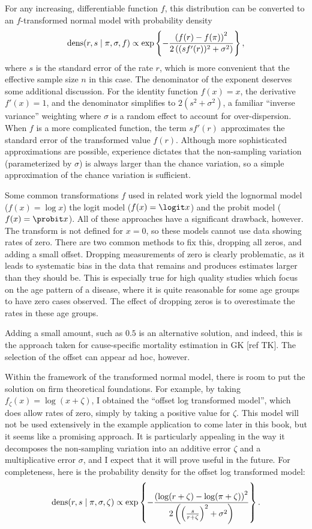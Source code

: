 For any increasing, differentiable function $f$, this distribution can be converted to
an $f$-transformed normal model with probability density
\[
\operatorname{dens}(r,s\;|\; \pi, \sigma, f) \propto \exp\left\{-\frac{\left(f(r)-f(\pi)\right)^2}{2\left((sf'(r))^2+\sigma^2\right)}\right\},
\]
where $s$ is the standard error of the rate $r$, which is more
convenient that the effective sample size $n$ in this case. The
denominator of the exponent deserves some additional discussion.  For
the identity function $f(x) = x$, the derivative $f'(x) = 1$, and the
denominator simplifies to $2(s^2 + \sigma^2)$, a familiar ``inverse
variance'' weighting where $\sigma$ is a random effect to account for
over-dispersion.  When $f$ is a more complicated function, the term
$sf'(r)$ approximates the standard error of the transformed value
$f(r)$.  Although more sophisticated approximations are possible,
experience dictates that the non-sampling variation (parameterized by
$\sigma$) is always larger than the chance variation, so a simple
approximation of the chance variation is sufficient.

Some common transformations $f$ used in related work yield the
lognormal model ($f(x) = \log x$) the logit model ($f(x) = \logit x$)
and the probit model ($f(x) = \probit x$).  All of these approaches
have a significant drawback, however.  The transform is not defined
for $x=0$, so these models cannot use data showing rates of zero.
There are two common methods to fix this, dropping all zeros, and
adding a small offset.  Dropping measurements of zero is clearly
problematic, as it leads to systematic bias in the data that remains
and produces estimates larger than they should be.  This is especially
true for high quality studies which focus on the age pattern of a
disease, where it is quite reasonable for some age groups to have zero
cases observed.  The effect of dropping zeros is to overestimate the
rates in these age groups.

Adding a small amount, such as $0.5$ is an alternative solution, and
indeed, this is the approach taken for cause-specific mortality estimation
in GK [ref TK].  The selection of the offset can appear ad hoc,
however.

Within the framework of the transformed normal model, there is
room to put the solution on firm theoretical foundations.  For
example, by taking $f_\zeta(x) = \log(x + \zeta)$, I obtained the
``offset log transformed model'', which does allow rates of zero,
simply by taking a positive value for $\zeta$.  This model will not be
used extensively in the example application to come later in this
book, but it seems like a promising approach.  It is particularly
appealing in the way it decomposes the non-sampling variation into an
additive error $\zeta$ and a multiplicative error $\sigma$, and I
expect that it will prove useful in the future.  For completeness,
here is the probability density for the offset log transformed model:
\[
\operatorname{dens}(r,s\;|\; \pi, \sigma, \zeta) \propto
\exp\left\{-\frac{\left(\log(r+\zeta)-\log(\pi+\zeta)\right)^2}{2\left(\left(\frac{s}{r+\zeta}\right)^2+\sigma^2\right)}\right\}.
\]

